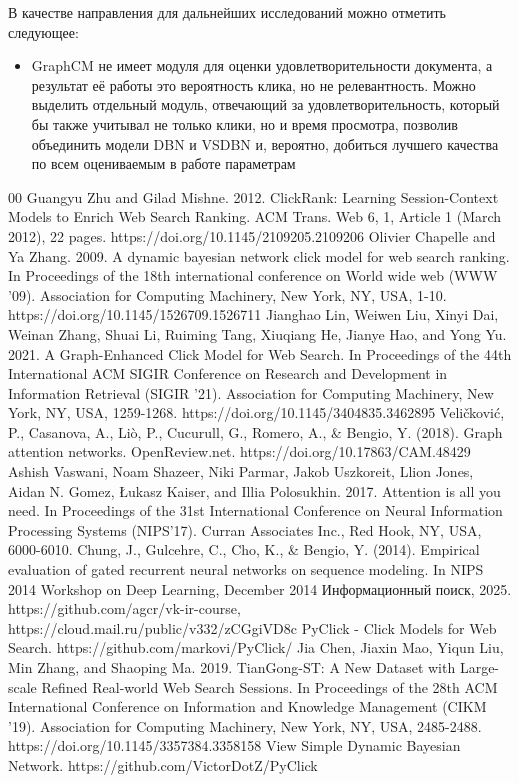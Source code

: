 \documentclass[diploma]{nanolab2015}
\begin{document}
  В качестве направления для дальнейших исследований можно отметить следующее:
  \begin{itemize}
    \item GraphCM не имеет модуля для оценки удовлетворительности документа, а результат её работы это вероятность клика, но не релевантность. Можно выделить отдельный модуль, отвечающий за удовлетворительность, который бы также учитывал не только клики, но и время просмотра, позволив объединить модели DBN и VSDBN и, вероятно, добиться лучшего качества по всем оцениваемым в работе параметрам
  \end{itemize}

  \begin{thebibliography}{00}
    Guangyu Zhu and Gilad Mishne. 2012. ClickRank: Learning Session-Context Models to Enrich Web Search Ranking. ACM Trans. Web 6, 1, Article 1 (March 2012), 22 pages. https://doi.org/10.1145/2109205.2109206
    Olivier Chapelle and Ya Zhang. 2009. A dynamic bayesian network click model for web search ranking. In Proceedings of the 18th international conference on World wide web (WWW '09). Association for Computing Machinery, New York, NY, USA, 1-10. https://doi.org/10.1145/1526709.1526711
    Jianghao Lin, Weiwen Liu, Xinyi Dai, Weinan Zhang, Shuai Li, Ruiming Tang, Xiuqiang He, Jianye Hao, and Yong Yu. 2021. A Graph-Enhanced Click Model for Web Search. In Proceedings of the 44th International ACM SIGIR Conference on Research and Development in Information Retrieval (SIGIR '21). Association for Computing Machinery, New York, NY, USA, 1259-1268. https://doi.org/10.1145/3404835.3462895
    Veličković, P., Casanova, A., Liò, P., Cucurull, G., Romero, A., \& Bengio, Y. (2018). Graph attention networks. OpenReview.net. https://doi.org/10.17863/CAM.48429
    Ashish Vaswani, Noam Shazeer, Niki Parmar, Jakob Uszkoreit, Llion Jones, Aidan N. Gomez, Łukasz Kaiser, and Illia Polosukhin. 2017. Attention is all you need. In Proceedings of the 31st International Conference on Neural Information Processing Systems (NIPS'17). Curran Associates Inc., Red Hook, NY, USA, 6000-6010.
    Chung, J., Gulcehre, C., Cho, K., \& Bengio, Y. (2014). Empirical evaluation of gated recurrent neural networks on sequence modeling. In NIPS 2014 Workshop on Deep Learning, December 2014
    Информационный поиск, 2025. https://github.com/agcr/vk-ir-course, https://cloud.mail.ru/public/v332/zCGgiVD8c
    PyClick - Click Models for Web Search. https://github.com/markovi/PyClick/
    Jia Chen, Jiaxin Mao, Yiqun Liu, Min Zhang, and Shaoping Ma. 2019. TianGong-ST: A New Dataset with Large-scale Refined Real-world Web Search Sessions. In Proceedings of the 28th ACM International Conference on Information and Knowledge Management (CIKM '19). Association for Computing Machinery, New York, NY, USA, 2485-2488. https://doi.org/10.1145/3357384.3358158
    View Simple Dynamic Bayesian Network. https://github.com/VictorDotZ/PyClick
  \end{thebibliography}

  
\end{document}
